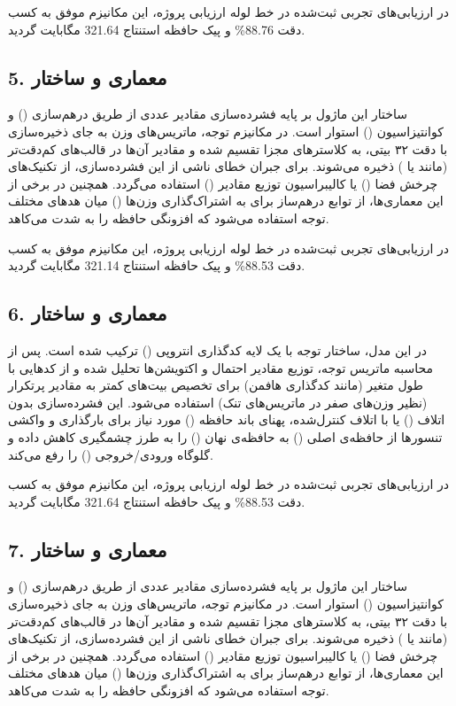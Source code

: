\documentclass[12pt,a4paper]{report}
\theoremstyle{definition}
\begin{document}
در ارزیابی‌های تجربی ثبت‌شده در خط لوله ارزیابی پروژه، این مکانیزم موفق به کسب دقت 88.76\% و پیک حافظه استنتاج 321.64 مگابایت گردید.

\subsection*{5. معماری و ساختار }
ساختار این ماژول بر پایه فشرده‌سازی مقادیر عددی از طریق درهم‌سازی () و کوانتیزاسیون () استوار است. در مکانیزم توجه، ماتریس‌های وزن به جای ذخیره‌سازی با دقت ۳۲ بیتی، به کلاسترهای مجزا تقسیم شده و مقادیر آن‌ها در قالب‌های کم‌دقت‌تر (مانند  یا ) ذخیره می‌شوند. برای جبران خطای ناشی از این فشرده‌سازی، از تکنیک‌های چرخش فضا () یا کالیبراسیون توزیع مقادیر () استفاده می‌گردد. همچنین در برخی از این معماری‌ها، از توابع درهم‌ساز برای به اشتراک‌گذاری وزن‌ها () میان هد‌های مختلف توجه استفاده می‌شود که افزونگی حافظه را به شدت می‌کاهد.

در ارزیابی‌های تجربی ثبت‌شده در خط لوله ارزیابی پروژه، این مکانیزم موفق به کسب دقت 88.53\% و پیک حافظه استنتاج 321.14 مگابایت گردید.

\subsection*{6. معماری و ساختار }
در این مدل، ساختار توجه با یک لایه کدگذاری انتروپی () ترکیب شده است. پس از محاسبه ماتریس توجه، توزیع مقادیر احتمال و اکتویشن‌ها تحلیل شده و از کدهایی با طول متغیر (مانند کدگذاری هافمن) برای تخصیص بیت‌های کمتر به مقادیر پرتکرار (نظیر وزن‌های صفر در ماتریس‌های تنک) استفاده می‌شود. این فشرده‌سازی بدون اتلاف () یا با اتلاف کنترل‌شده، پهنای باند حافظه () مورد نیاز برای بارگذاری و واکشی تنسورها از حافظه‌ی اصلی () به حافظه‌ی نهان () را به طرز چشمگیری کاهش داده و گلوگاه ورودی/خروجی () را رفع می‌کند.

در ارزیابی‌های تجربی ثبت‌شده در خط لوله ارزیابی پروژه، این مکانیزم موفق به کسب دقت 88.53\% و پیک حافظه استنتاج 321.64 مگابایت گردید.

\subsection*{7. معماری و ساختار }
ساختار این ماژول بر پایه فشرده‌سازی مقادیر عددی از طریق درهم‌سازی () و کوانتیزاسیون () استوار است. در مکانیزم توجه، ماتریس‌های وزن به جای ذخیره‌سازی با دقت ۳۲ بیتی، به کلاسترهای مجزا تقسیم شده و مقادیر آن‌ها در قالب‌های کم‌دقت‌تر (مانند  یا ) ذخیره می‌شوند. برای جبران خطای ناشی از این فشرده‌سازی، از تکنیک‌های چرخش فضا () یا کالیبراسیون توزیع مقادیر () استفاده می‌گردد. همچنین در برخی از این معماری‌ها، از توابع درهم‌ساز برای به اشتراک‌گذاری وزن‌ها () میان هد‌های مختلف توجه استفاده می‌شود که افزونگی حافظه را به شدت می‌کاهد.
\end{document}
